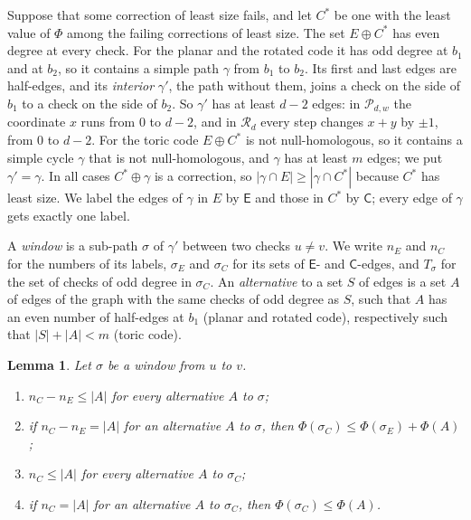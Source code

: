 \documentclass[11pt]{amsart}
\newtheorem{lemma}[theorem]{Lemma}
\theoremstyle{definition}
\theoremstyle{remark}
\numberwithin{equation}{section}
\begin{document}
Suppose that some correction of least size fails, and let $C^\ast$ be one with the least value of $\Phi$ among the
failing corrections of least size. The set $E\oplus C^\ast$ has even degree at every check. For the planar and the
rotated code it has odd degree at $b_1$ and at $b_2$, so it contains a simple path $\gamma$ from $b_1$ to $b_2$. Its
first and last edges are half-edges, and its \emph{interior} $\gamma'$, the path without them, joins a check on the
side of $b_1$ to a check on the side of $b_2$. So $\gamma'$ has at least $d-2$ edges: in $\mathcal P_{d,w}$ the
coordinate $x$ runs from $0$ to $d-2$, and in $\mathcal R_d$ every step changes $x+y$ by $\pm1$, from $0$ to $d-2$.
For the toric code $E\oplus C^\ast$ is not null-homologous, so it contains a simple cycle $\gamma$ that is not
null-homologous, and $\gamma$ has at least $m$ edges; we put $\gamma'=\gamma$. In all cases $C^\ast\oplus\gamma$ is a
correction, so $|\gamma\cap E|\ge|\gamma\cap C^\ast|$ because $C^\ast$ has least size. We label the edges of $\gamma$ in
$E$ by $\mathsf E$ and those in $C^\ast$ by $\mathsf C$; every edge of $\gamma$ gets exactly one label.

A \emph{window} is a sub-path $\sigma$ of $\gamma'$ between two checks $u\ne v$. We write $n_E$ and $n_C$ for the
numbers of its labels, $\sigma_E$ and $\sigma_C$ for its sets of $\mathsf E$- and $\mathsf C$-edges, and $T_\sigma$
for the set of checks of odd degree in $\sigma_C$. An \emph{alternative} to a set $S$ of edges is a set $A$ of edges of
the graph with the same checks of odd degree as $S$, such that $A$ has an even number of half-edges at $b_1$ (planar
and rotated code), respectively such that $|S|+|A|<m$ (toric code).

\begin{lemma}\label{cnt:lem-rules}
Let $\sigma$ be a window from $u$ to $v$.
\begin{enumerate}[label=\textup{(\roman*)}]
\item $n_C-n_E\le|A|$ for every alternative $A$ to $\sigma$;
\item if $n_C-n_E=|A|$ for an alternative $A$ to $\sigma$, then $\Phi(\sigma_C)\le\Phi(\sigma_E)+\Phi(A)$;
\item $n_C\le|A|$ for every alternative $A$ to $\sigma_C$;
\item if $n_C=|A|$ for an alternative $A$ to $\sigma_C$, then $\Phi(\sigma_C)\le\Phi(A)$.
\end{enumerate}
\end{lemma}
\end{document}
